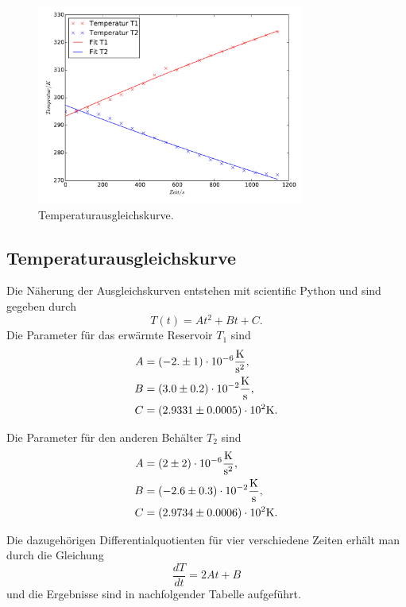 \begin{figure}
  \centering
  \includegraphics[width=0.78\textwidth]{Temperaturgraphik.pdf}
  \caption{Temperaturausgleichskurve.}
\end{figure}
\newpage
\subsection{Temperaturausgleichskurve}
Die Näherung der Ausgleichskurven entstehen mit scientific Python und sind gegeben durch
\begin{equation}
  T(t)=At^2+Bt+C .
\end{equation}
Die Parameter für das erwärmte Reservoir $T_1$ sind
\begin{align*}
  A &=(-2.\pm1)\cdot10^{-6}\si{\frac{\kelvin}{\second^2}}, \\
  B &=(3.0\pm0.2)\cdot10^{-2}\si{\frac{\kelvin}{\second}}, \\
  C &=(2.9331\pm0.0005)\cdot10^{2}\si{\kelvin}.
\end{align*}

Die Parameter für den anderen Behälter $T_2$ sind
\begin{align*}
  A &= (2\pm2)\cdot10^{-6}\si{\frac{\kelvin}{\second^2}}, \\
  B &= (-2.6\pm0.3)\cdot10^{-2}\si{\frac{\kelvin}{\second}}, \\
  C &= (2.9734\pm0.0006)\cdot10^{2}\si{\kelvin}.
\end{align*}

Die dazugehörigen Differentialquotienten für vier verschiedene Zeiten erhält man
durch die Gleichung
\begin{equation}
  \frac{dT}{dt}=2At+B
\end{equation}
und die Ergebnisse sind in nachfolgender Tabelle aufgeführt.

